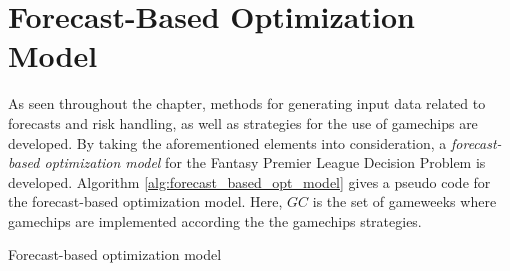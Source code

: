 \section{Forecast-Based Optimization Model}

As seen throughout the chapter, methods for generating input data related to forecasts and risk handling, as well as strategies for the use of gamechips are developed. By taking the aforementioned elements into consideration, a \textit{forecast-based optimization model} for the Fantasy Premier League Decision Problem is developed. Algorithm \ref{alg:forecast_based_opt_model} gives a pseudo code for the forecast-based optimization model. Here, ${GC}$ is the set of gameweeks where gamechips are implemented according the the gamechips strategies. 



\begin{algorithm}[H]
\caption{Forecast-based optimization model}
\begin{algorithmic}
    \EndIf
\EndWhile
\end{algorithmic}
\label{alg:forecast_based_opt_model}
\end{algorithm}













